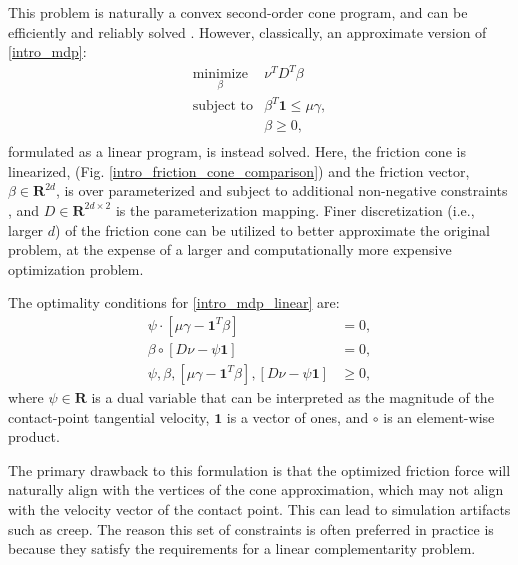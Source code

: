 This problem is naturally a convex second-order cone program, and can be efficiently and reliably solved \cite{lobo1998applications}. However, classically, an approximate version of \eqref{intro_mdp}:
\begin{equation}
	\begin{array}{ll}
		\underset{\beta}{\mbox{minimize}} & \nu^T D^T \beta \\
		\mbox{subject to} & \beta^T \textbf{1} \leq \mu \gamma, \\
		& \beta \geq 0, \\
	\end{array} \label{intro_mdp_linear}
\end{equation}
formulated as a linear program, is instead solved. Here, the friction cone is linearized, (Fig. \ref{intro_friction_cone_comparison}) and the friction vector, $\beta \in \mathbf{R}^{2 d}$, is over parameterized and subject to additional non-negative constraints \cite{stewart1996implicit}, and $D \in \mathbf{R}^{2d \times 2}$ is the parameterization mapping. Finer discretization (i.e., larger $d$) of the friction cone can be utilized to better approximate the original problem, at the expense of a larger and computationally more expensive optimization problem.

The optimality conditions for \eqref{intro_mdp_linear} are:
\begin{align}
	\psi \cdot [\mu \gamma - \textbf{1}^T \beta] &= 0, \label{intro_friction_velocity_complementarity}\\
	\beta \circ [D \nu - \psi \textbf{1}] &= 0, \label{intro_friction_impulse_complementarity}\\
	\psi, \beta, [\mu \gamma - \textbf{1}^T \beta], [D \nu - \psi \textbf{1}] & \geq 0 \label{intro_friction_inequality}, 
\end{align}
where $\psi \in \mathbf{R}$ is a dual variable that can be interpreted as the magnitude of the contact-point tangential velocity, $\textbf{1}$ is a vector of ones, and $\circ$ is an element-wise product.

The primary drawback to this formulation is that the optimized friction force will naturally align with the vertices of the cone approximation, which may not align with the velocity vector of the contact point. This can lead to simulation artifacts such as creep. The reason this set of constraints is often preferred in practice is because they satisfy the requirements for a linear complementarity problem.

